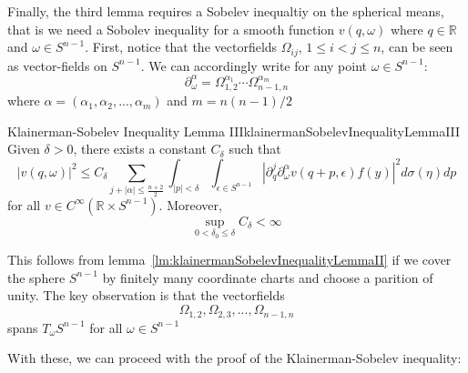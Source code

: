 \documentclass{book}
\newenvironment{Proof}[1][]
  {\begin{ProofTcb}[#1]}
  {\end{ProofTcb}}
\newcommand{\R}{{\mathbb{R}}}
\begin{document}
Finally, the third lemma requires a Sobelev inequaltiy on the spherical means, that is we need a Sobolev inequality for
a smooth function $v(q, \omega)$ where $q \in \R$ and $\omega \in S^{n-1}$. First, notice that the vectorfields
$\Omega_{ij}$, $1 \le i < j \le n$, can be seen as vector-fields on $S^{n-1}$. We can accordingly write for any point
$\omega \in S^{n-1}$:
\[
	\partial_\omega^\alpha = \Omega_{1,2}^{\alpha_1}\cdots \Omega_{n-1, n}^{\alpha_m}
\]
where $\alpha = (\alpha_1, \alpha_2, ..., \alpha_m)$ and $m  = n(n-1)/2$


\begin{lem}{Klainerman-Sobelev Inequality Lemma III}{klainermanSobelevInequalityLemmaIII}
	Given $\delta > 0$, there exists a constant $C_\delta$ such that
	\[
		|v(q,\omega)|^2 \le C_\delta \sum_{ j+ |\alpha| \le \frac{n+2}{2} } \int_{|p| < \delta} \int_{\epsilon \in
		S^{n-1}}  |  \partial_q^j  \partial_\omega^\alpha v(q+p, \epsilon) f(y)|^2d\sigma(\eta)dp
	\]
	for all $v \in C^\infty(\R\times S^{n-1})$. Moreover,
	\[
		\sup_{0 < \delta_0 \le \delta} C_\delta < \infty
	\]
\end{lem}

\begin{Proof}
	This follows from lemma~\ref{lm:klainermanSobelevInequalityLemmaII} if we cover the sphere $S^{n-1}$ by finitely
	many coordinate charts and choose a parition of unity. The key observation is that the vectorfields
	\[
		\Omega_{1,2}, \Omega_{2,3}, ...,  \Omega_{n-1, n}
	\]
	spans $T_\omega S^{n-1}$ for all $\omega \in S^{n-1}$
\end{Proof}

With these, we can proceed with the proof of the Klainerman-Sobelev inequality:
\end{document}
